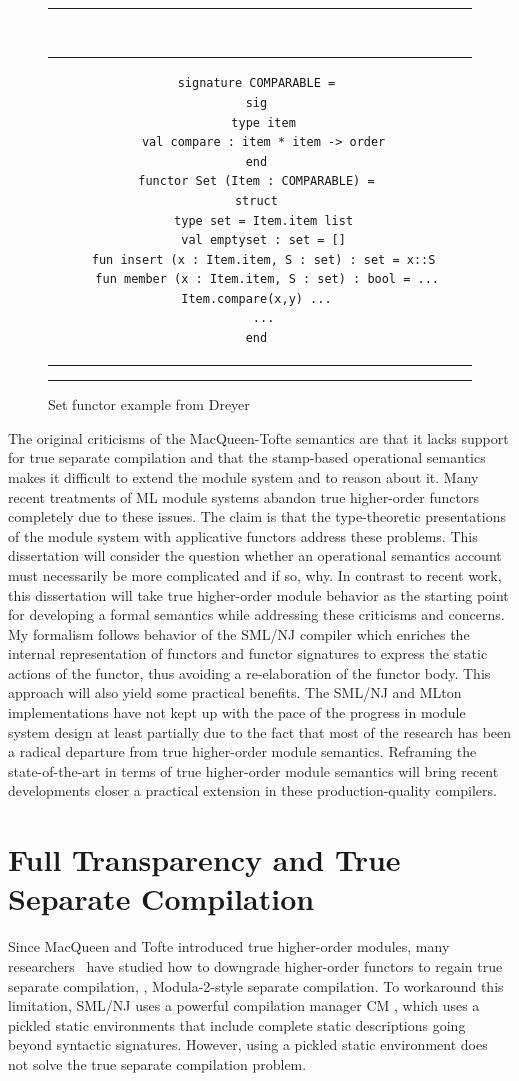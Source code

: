\begin{figure}
\hrule
~
\begin{center}
\begin{tabular}{c}
\begin{lstlisting}
signature COMPARABLE = 
sig 
  type item 
  val compare : item * item -> order 
end 
functor Set (Item : COMPARABLE) = 
struct 
  type set = Item.item list 
  val emptyset : set = [] 
  fun insert (x : Item.item, S : set) : set = x::S 
  fun member (x : Item.item, S : set) : bool = ... Item.compare(x,y) ... 
  ... 
end 
\end{lstlisting}
\end{tabular}
\end{center}	
\hrule
\caption{Set functor example from Dreyer~\cite{dreyerthesis}}
\label{fig:setfct}
\end{figure}

The original criticisms of the MacQueen-Tofte semantics are that it lacks
support for true separate compilation and that the stamp-based
operational semantics makes it difficult to extend the module system
and to reason about it. Many recent treatments of ML module systems
abandon true higher-order functors completely due to these
issues. The claim is that the type-theoretic presentations of the
module system with applicative functors address these problems. This
dissertation will consider the question whether an operational
semantics account must necessarily be more complicated and if so,
why. In contrast to recent work, this dissertation will take true
higher-order module behavior as the starting point for developing a formal semantics while addressing these criticisms and concerns. My formalism follows behavior of the SML/NJ compiler which enriches the internal representation of functors and functor signatures to express the static actions of the functor, thus avoiding a re-elaboration of the functor body. This approach will also yield some practical benefits. The SML/NJ and MLton implementations have not kept up with the pace of the progress in module system design at least partially due to the fact that most of the research has been a radical departure from true higher-order module semantics. Reframing the state-of-the-art in terms of true higher-order module semantics will bring recent developments closer a practical extension in these production-quality compilers. 

\section{Full Transparency and True Separate Compilation}
		Since MacQueen and Tofte introduced true higher-order modules, many researchers~\cite{leroy94,russothesis,mixml} have studied how to downgrade higher-order functors to regain true separate compilation, \ie, Modula-2-style separate compilation. To workaround this limitation, SML/NJ \cite{am:pldi94,hlpr:tr94} uses a powerful compilation manager CM \cite{blume95:cm}, which uses a pickled static environments that include complete static descriptions going beyond syntactic signatures. However, using a pickled static environment does not solve the true separate compilation problem. 
		
